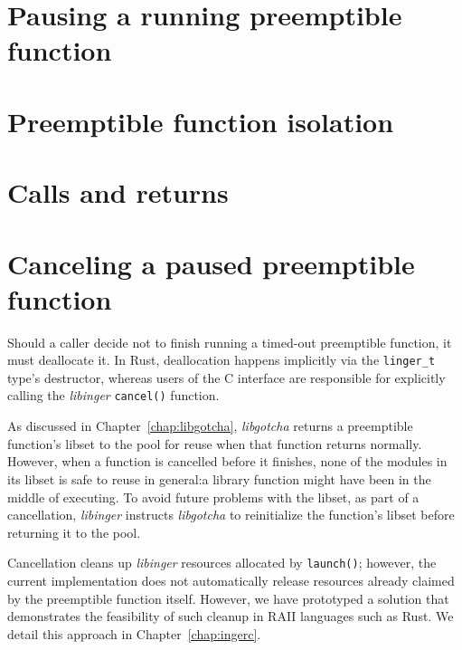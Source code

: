 


\section{Pausing a running preemptible function}
\label{sec:libinger:pausing}


\section{Preemptible function isolation}
\label{sec:libinger:isolation}


\section{Calls and returns}
\label{sec:libinger:jumps}


\section{Canceling a paused preemptible function}
\label{sec:libinger:cancellation}

Should a caller decide not to finish running a timed-out preemptible function, it
must deallocate it.  In Rust, deallocation happens implicitly via the
\texttt{linger\_t} type's destructor, whereas users of the C interface are responsible
for explicitly calling the \textit{libinger} \texttt{cancel()} function.

As discussed in Chapter~\ref{chap:libgotcha}, \textit{libgotcha} returns a
preemptible function's libset to the pool for reuse when that function returns
normally.  However, when a function is cancelled before it finishes, none of the
modules in its libset is safe to reuse in general:\@ a library function might have
been in the middle of executing.  To avoid future problems with the libset, as part
of a cancellation, \textit{libinger} instructs \textit{libgotcha} to reinitialize the
function's libset before returning it to the pool.

Cancellation cleans up \textit{libinger} resources allocated by \texttt{launch()};
however, the current implementation does not automatically release resources already
claimed by the preemptible function itself.  However, we have prototyped a solution
that demonstrates the feasibility of such cleanup in RAII languages such as Rust.
We detail this approach in Chapter~\ref{chap:ingerc}.


